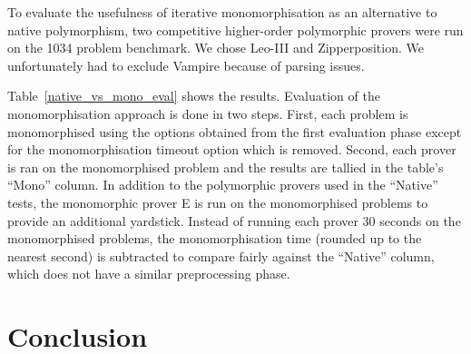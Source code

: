\documentclass[runningheads]{llncs}
\begin{document}
To evaluate the usefulness of iterative monomorphisation as an alternative to native polymorphism, two competitive higher-order polymorphic provers were run on the 1034 problem benchmark. We chose Leo-III and Zipperposition. We unfortunately had to exclude Vampire because of parsing issues.

Table~\ref{native_vs_mono_eval} shows the results.
 Evaluation of the monomorphisation approach is done in two steps. First, each problem is monomorphised using the options obtained from the first evaluation phase except for the monomorphisation timeout option which is removed. Second, each prover is ran on the monomorphised problem and the results are tallied in the table's ``Mono'' column. In addition to the polymorphic provers used in the ``Native'' tests, the monomorphic prover E is run on the monomorphised problems to provide an additional yardstick. Instead of running each prover 30 seconds on the monomorphised problems, the monomorphisation time (rounded up to the nearest second) is subtracted to compare fairly against the ``Native'' column, which does not have a similar preprocessing phase.

%
%
%    

\section{Conclusion}
\label{sec:conclusion}
\end{document}
